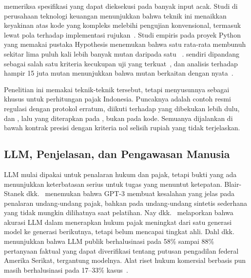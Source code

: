  memeriksa spesifikasi yang dapat dieksekusi pada banyak input acak. Studi di perusahaan teknologi keuangan menunjukkan bahwa teknik ini menaikkan keyakinan atas kode yang kompleks melebihi pengujian konvensional, termasuk lewat pola  terhadap implementasi rujukan~\cite{goldstein2024pbt}. Studi empiris pada proyek Python yang memakai pustaka Hypothesis menemukan bahwa satu  rata-rata membunuh sekitar lima puluh kali lebih banyak mutan daripada satu ~\cite{ravi2025pbtpython}.  sendiri dipandang sebagai salah satu kriteria kecukupan uji yang terkuat~\cite{petrovic2022mutation}, dan analisis terhadap hampir 15 juta mutan menunjukkan bahwa mutan berkaitan dengan  nyata~\cite{petrovic2021mutation}.

Penelitian ini memakai teknik-teknik tersebut, tetapi menyusunnya sebagai  khusus untuk perhitungan pajak Indonesia. Puncaknya adalah contoh resmi regulasi dengan protokol erratum, diikuti  terhadap  yang dibekukan lebih dulu,  dan , lalu  yang diterapkan pada \emph{}, bukan pada kode. Semuanya dijalankan di bawah kontrak presisi dengan kriteria nol selisih rupiah yang tidak terjelaskan.

\subsection{LLM, Penjelasan, dan Pengawasan Manusia}

LLM mulai dipakai untuk penalaran hukum dan pajak, tetapi bukti yang ada menunjukkan keterbatasan serius untuk tugas yang menuntut ketepatan. Blair-Stanek dkk.~\cite{blairstanek2023gpt3} menemukan bahwa GPT-3 membuat kesalahan yang jelas pada penalaran undang-undang pajak, bahkan pada undang-undang sintetis sederhana yang tidak mungkin dilihatnya saat pelatihan. Nay dkk.~\cite{nay2024taxattorneys} melaporkan bahwa akurasi LLM dalam menerapkan hukum pajak meningkat dari satu generasi model ke generasi berikutnya, tetapi belum mencapai tingkat ahli. Dahl dkk.~\cite{dahl2024legalfictions} menunjukkan bahwa LLM publik berhalusinasi pada 58\% sampai 88\% pertanyaan faktual yang dapat diverifikasi tentang putusan pengadilan federal Amerika Serikat, tergantung modelnya. Alat riset hukum komersial berbasis  pun masih berhalusinasi pada 17--33\% kasus~\cite{magesh2025hallucination}.

